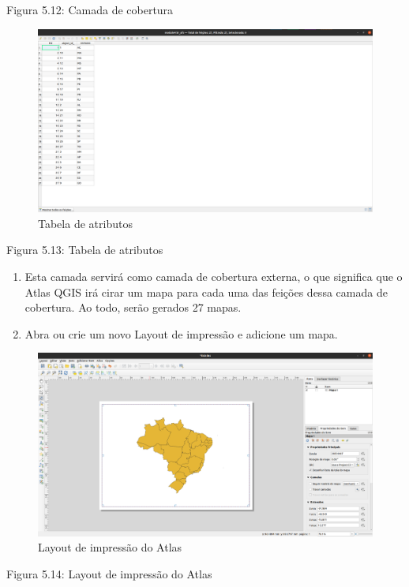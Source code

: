 \documentclass[
]{book}
\begin{document}
Figura 5.12: Camada de cobertura

\begin{figure}
\centering
\includegraphics{media/modulo5/atlas-attr.png}
\caption{Tabela de atributos}
\end{figure}

Figura 5.13: Tabela de atributos

\begin{enumerate}
\def\labelenumi{\arabic{enumi}.}
\item
  Esta camada servirá como camada de cobertura externa, o que significa que o Atlas QGIS irá cirar um mapa para cada uma das feições dessa camada de cobertura. Ao todo, serão gerados 27 mapas.
\item
  Abra ou crie um novo Layout de impressão e adicione um mapa.
\end{enumerate}

\begin{figure}
\centering
\includegraphics{media/modulo5/atlas-print-layout.png}
\caption{Layout de impressão do Atlas}
\end{figure}

Figura 5.14: Layout de impressão do Atlas
\end{document}
